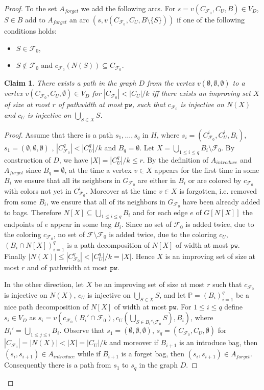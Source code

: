 \documentclass[11pt]{article}
\newtheorem{claim}[theorem]{Claim}
\theoremstyle{definition}
\newcommand{\cF}{{\mathcal{F}}}
\newcommand{\cg}{G_{\cF_0}}
\newcommand{\pw}{\ensuremath{\mathtt{pw}}\xspace}
\newcommand{\pathdecomp}{\mathbb{P}\xspace}
\begin{document}
\begin{proof}
To the set $A_{forget}$ we add the following arcs.
For $s = v(C_{\cF_0},C_U,B)  \in V_D$, $S \in B$  add to $A_{forget}$
an arc  $(s, v(C_{\cF_0}, C_U, B \setminus \{S\}))$
if one of the following conditions holds:
\begin{itemize}
  \item $S \in \cF_0$,
  \item $S \not\in \cF_0$ and $c_{\cF_0}(N(S)) \subseteq C_{\cF_0}$.
\end{itemize}

\begin{claim}
There exists a path in the graph $D$ from the vertex $v(\emptyset, \emptyset, \emptyset)$
to a vertex $v(C_{\cF_0}, C_U, \emptyset) \in V_D$ for $|C_{\cF_0}| < |C_U| / k$
iff
there exists an improving set $X$ of size at most $r$ of pathwidth at most $\pw$,
such that $c_{\cF_0}$ is injective on $N(X)$ and $c_U$ is injective on $\bigcup_{S \in X} S$.
\end{claim}

\begin{proof}
Assume that there is a path $s_1,\ldots,s_q$ in $H$,
where $s_i=(C_{\cF_0}^i,C_U^i,B_i)$, $s_1=(\emptyset,\emptyset,\emptyset)$ , $|C_{\cF_0}^q| < |C_U^q|/k$ and $B_q=\emptyset$.
Let $X = \bigcup_{1 \le i \le q} B_i \setminus \cF_0$.
By construction of $D$, we have $|X|=|C_U^q| / k \le r$.
By the definition of $A_{introduce}$ and $A_{forget}$
since $B_q=\emptyset$, at the time a vertex $v \in X$ appears
for the first time in some $B_i$ we ensure that all its neighbors in $\cg$
are either in $B_i$ or are colored by $c_{\cF_0}$ with colors not yet in $C_{\cF_0}^i$.
Moreover at the time $v \in X$ is forgotten, i.e. removed from some $B_i$,
we ensure that all of its neighbors in $\cg$ have been already added to bags.
Therefore $N[X] \subseteq \bigcup_{1 \le i \le q} B_i$ and for each 
edge $e$ of $G[N[X]]$ the endpoints of $e$ appear in some bag $B_i$.
Since no set of $\cF_0$ is added twice, due to the coloring $c_{\cF_0}$,
no set of $\cF \setminus \cF_0$ is added twice, due to the coloring $c_U$,
$(B_i \cap N[X])_{i=1}^q$ is a path decomposition of $N[X]$ of width at most $\pw$.
Finally $|N(X)| \le |C^q_{\cF_0}| < |C^q_U|/k = |X|$.
Hence $X$ is an improving set of size at most $r$ and of pathwidth at most $\pw$.

In the other direction, let $X$ be an improving set of size at most $r$ 
such that $c_{\cF_0}$ is injective on $N(X)$, $c_U$ is injective on $\bigcup_{S \in X} S$,
and let $\pathdecomp=(B_i)_{i=1}^q$ be a nice path decomposition of $N[X]$ of width at most $\pw$.
For $1 \le i \le q$ define $s_i \in V_D$ as $s_i = v(c_{\cF_0}(B_i' \cap \cF_0), c_U(\bigcup_{S \in B_i' \setminus \cF_0} S), B_i)$,
where $B_i' = \bigcup_{1 \le j \le i} B_i$.
Observe that $s_1=(\emptyset,\emptyset,\emptyset)$, $s_q=(C_{\cF_0}, C_U, \emptyset)$ for $|C_{\cF_0}| = |N(X)| < |X| = |C_U| / k$
and moreover if $B_{i+1}$ is an introduce bag, then $(s_i,s_{i+1}) \in A_{introduce}$
while if $B_{i+1}$ is a forget bag, then $(s_i,s_{i+1}) \in A_{forget}$.
Consequently there is a path from $s_1$ to $s_q$ in the graph $D$.


\end{proof}
\end{proof}
\end{document}
